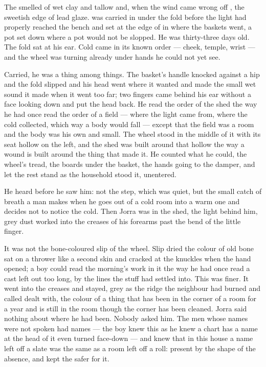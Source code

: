 
The  smelled of wet clay and tallow and, when the wind came wrong off , the sweetish edge of lead glaze.  was carried in under the fold before the light had properly reached the bench and set at the edge of  in  where the baskets went, a pot set down where a pot would not be slopped. He was thirty-three days old. The fold sat at his ear. Cold came in its known order --- cheek, temple, wrist --- and the wheel was turning already under hands he could not yet see.

Carried, he was a thing among things. The basket's handle knocked against a hip and the fold slipped and his head went where it wanted and made the small wet sound it made when it went too far; two fingers came behind his ear without a face looking down and put the head back. He read the order of the shed the way he had once read the order of a field --- where the light came from, where the cold collected, which way a body would fall --- except that the field was a room and the body was his own and small. The wheel stood in the middle of it with its seat hollow on the left, and the shed was built around that hollow the way a wound is built around the thing that made it. He counted what he could, the wheel's tread, the boards under the basket, the hands going to the damper, and let the rest stand as the household stood it, unentered.

He heard  before he saw him: not the step, which was quiet, but the small catch of breath a man makes when he goes out of a cold room into a warm one and decides not to notice the cold. Then Jorra was in the shed, the light behind him, grey dust worked into the creases of his forearms past the bend of the little finger.

It was not the bone-coloured slip of the wheel. Slip dried the colour of old bone sat on a thrower like a second skin and cracked at the knuckles when the hand opened; a boy could read the morning's work in it the way he had once read a cast left out too long, by the lines the stuff had settled into. This was finer. It went into the creases and stayed, grey as the ridge the neighbour had burned and called dealt with, the colour of a thing that has been in the corner of a room for a year and is still in the room though the corner has been cleaned. Jorra said nothing about where he had been. Nobody asked him. The men whose names were not spoken had names --- the boy knew this as he knew a chart has a name at the head of it even turned face-down --- and knew that in this house a name left off a slate was the same as a room left off a roll: present by the shape of the absence, and kept the safer for it.

